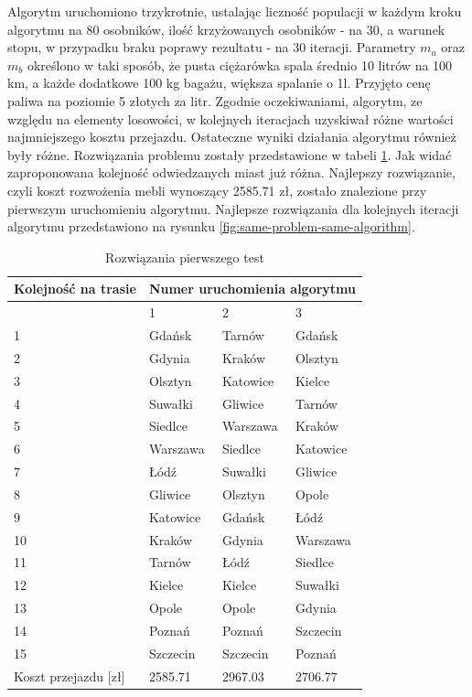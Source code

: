 \documentclass[12pt, oneside, final]{report}
\begin{document}
Algorytm uruchomiono trzykrotnie, ustalając liczność populacji w każdym kroku algorytmu na 80 osobników, ilość krzyżowanych osobników - na 30, a warunek stopu, w przypadku braku poprawy rezultatu - na 30 iteracji. Parametry $m_a$ oraz $m_b$ określono w taki sposób, że pusta ciężarówka spala średnio 10 litrów na 100 km, a każde dodatkowe 100 kg bagażu, większa spalanie o 1l. Przyjęto cenę paliwa na poziomie 5 złotych za litr. Zgodnie oczekiwaniami, algorytm, ze względu na elementy losowości, w kolejnych iteracjach uzyskiwał różne wartości najmniejszego kosztu przejazdu. Ostateczne wyniki działania algorytmu również były różne. Rozwiązania problemu zostały przedstawione w tabeli \ref{tab:results-same-algorithm}. Jak widać zaproponowana kolejność odwiedzanych miast już różna. Najlepszy rozwiązanie, czyli koszt rozwożenia mebli wynoszący 2585.71 zł, zostało znalezione przy pierwszym uruchomieniu algorytmu. Najlepsze rozwiązania dla kolejnych iteracji algorytmu przedstawiono na rysunku \ref{fig:same-problem-same-algorithm}.

\begin{table}[ht!]
\caption{Rozwiązania pierwszego test}
\label{tab:results-same-algorithm}
\centering
\begin{tabular}{llll}
\hline 
Kolejność na trasie & \multicolumn{3}{c}{Numer uruchomienia algorytmu}\\
\hline
						& 1 & 2 & 3\\
\hline
1 						& Gdańsk	& Tarnów	& Gdańsk\\
2						& Gdynia	& Kraków	& Olsztyn\\
3						& Olsztyn	& Katowice	& Kielce\\
4						& Suwałki	& Gliwice	& Tarnów\\
5						& Siedlce	& Warszawa	& Kraków\\
6						& Warszawa	& Siedlce	& Katowice\\
7						& Łódź		& Suwałki	& Gliwice\\
8						& Gliwice	& Olsztyn	& Opole\\
9						& Katowice	& Gdańsk	& Łódź\\
10						& Kraków	& Gdynia	& Warszawa\\
11						& Tarnów	& Łódź		& Siedlce\\
12						& Kielce	& Kielce	& Suwałki\\
13						& Opole		& Opole		& Gdynia\\
14						& Poznań	& Poznań	& Szczecin\\
15						& Szczecin	& Szczecin	& Poznań\\
\hline
Koszt przejazdu [zł]	& 2585.71	& 2967.03 	& 2706.77\\
\hline
\end{tabular}
\end{table}
\end{document}

